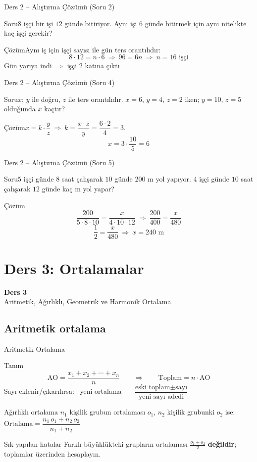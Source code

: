 \documentclass[aspectratio=169,11pt,handout]{beamer}
\newcommand{\soru}[3]{%
\begin{frame}{#1}
  \begin{block}{Soru}\large #2\end{block}
  \pause
  \begin{exampleblock}{Çözüm}\large #3\end{exampleblock}
\end{frame}}
\begin{document}
\soru{Ders 2 -- Alıştırma Çözümü (Soru 2)}
{\(8\) işçi bir işi \(12\) günde bitiriyor. Aynı işi \(6\) günde bitirmek için aynı nitelikte kaç işçi gerekir?}
{Aynı iş için işçi sayısı ile gün ters orantılıdır:
\[8\cdot 12=n\cdot 6\ \Rightarrow\ 96=6n\ \Rightarrow\ n=16\text{ işçi}\]
Gün yarıya indi \(\Rightarrow\) işçi \(2\) katına çıktı \checkmark}

\soru{Ders 2 -- Alıştırma Çözümü (Soru 4)}
{\(x\); \(y\) ile doğru, \(z\) ile ters orantılıdır. \(x=6\), \(y=4\), \(z=2\) iken; \(y=10\), \(z=5\) olduğunda \(x\) kaçtır?}
{\(x=k\cdot\dfrac{y}{z}\ \Rightarrow\ k=\dfrac{x\cdot z}{y}=\dfrac{6\cdot 2}{4}=3\).
\[x=3\cdot\frac{10}{5}=6\]}

\soru{Ders 2 -- Alıştırma Çözümü (Soru 5)}
{\(5\) işçi günde \(8\) saat çalışarak \(10\) günde \(200\) m yol yapıyor. \(4\) işçi günde \(10\) saat çalışarak \(12\) günde kaç m yol yapar?}
{\[\frac{200}{5\cdot 8\cdot 10}=\frac{x}{4\cdot 10\cdot 12}\ \Rightarrow\ \frac{200}{400}=\frac{x}{480}\]
\[\frac{1}{2}=\frac{x}{480}\ \Rightarrow\ x=240\text{ m}\]}


\section{Ders 3: Ortalamalar}
\begin{frame}
\centering\Large\color{anamavi}\textbf{Ders 3}\\[6pt]\normalsize Aritmetik, Ağırlıklı, Geometrik ve Harmonik Ortalama
\end{frame}

\subsection{Aritmetik ortalama}
\begin{frame}{Aritmetik Ortalama}
\begin{block}{Tanım}
\[\text{AO}=\frac{x_1+x_2+\cdots+x_n}{n}\qquad\Longrightarrow\qquad \text{Toplam}=n\cdot\text{AO}\]
Sayı eklenir/çıkarılırsa: \ yeni ortalama \(=\dfrac{\text{eski toplam}\pm\text{sayı}}{\text{yeni sayı adedi}}\)
\end{block}
\begin{block}{Ağırlıklı ortalama}
\(n_1\) kişilik grubun ortalaması \(o_1\), \(n_2\) kişilik grubunki \(o_2\) ise: \ \(\text{Ortalama}=\dfrac{n_1\,o_1+n_2\,o_2}{n_1+n_2}\)
\end{block}
\begin{alertblock}{Sık yapılan hatalar}
Farklı büyüklükteki grupların ortalaması \(\frac{o_1+o_2}{2}\) \textbf{değildir}; toplamlar üzerinden hesaplayın.
\end{alertblock}
\end{frame}
\end{document}
